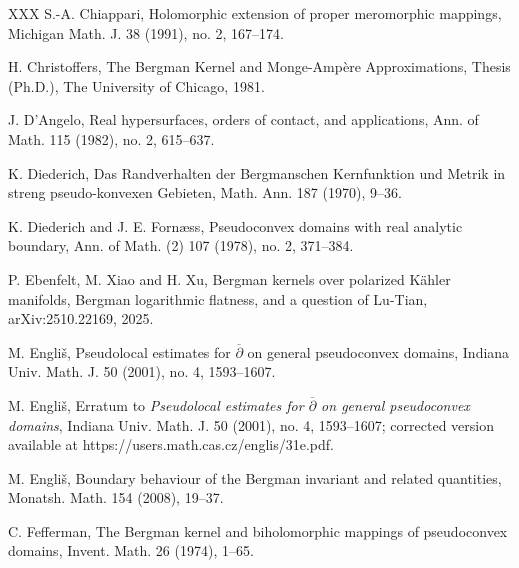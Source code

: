 \documentclass[a4paper,centertags,oneside,12pt]{amsart}
\numberwithin{equation}{section}
\begin{document}
\begin{thebibliography}{XXX}
 S.-A. Chiappari, Holomorphic extension of proper meromorphic mappings, Michigan Math. J. 38 (1991), no. 2, 167--174.

 H. Christoffers, The Bergman Kernel and Monge-Amp\`ere Approximations, Thesis (Ph.D.), The University of Chicago, 1981.

 J. D'Angelo, Real hypersurfaces, orders of contact, and applications, Ann. of Math. 115 (1982), no. 2, 615--637.

 K. Diederich, Das Randverhalten der Bergmanschen Kernfunktion und Metrik in streng pseudo-konvexen Gebieten, Math. Ann. 187 (1970), 9--36.

 K. Diederich and J. E. Forn{\ae}ss, Pseudoconvex domains with real analytic boundary, Ann. of Math. (2) 107 (1978), no. 2, 371--384.




 P. Ebenfelt, M. Xiao and H. Xu, Bergman kernels over polarized K\"ahler manifolds, Bergman logarithmic flatness, and a question of Lu-Tian, arXiv:2510.22169, 2025.

 M. Engli\v{s}, Pseudolocal estimates for $\overline\partial$ on general pseudoconvex domains, Indiana Univ. Math. J. 50 (2001), no. 4, 1593--1607.

 M. Engli\v{s}, Erratum to {\it Pseudolocal estimates for $\overline\partial$ on general pseudoconvex domains}, Indiana Univ. Math. J. 50 (2001), no. 4, 1593--1607; corrected version available at https://users.math.cas.cz/englis/31e.pdf.

 M. Engli\v{s}, Boundary behaviour of the Bergman invariant and related quantities, Monatsh. Math. 154 (2008), 19--37.

 C. Fefferman, The Bergman kernel and biholomorphic mappings of pseudoconvex domains, Invent. Math. 26 (1974), 1--65.


\end{thebibliography}
\end{document}
